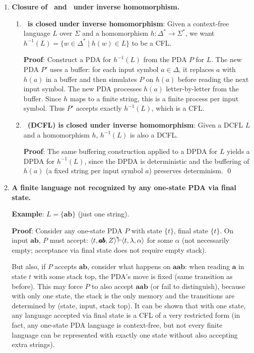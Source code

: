 \begin{enumerate}[{10.}1. ]
\item \textbf{Closure of \PSIG\ and \ASIG\ under inverse homomorphism.}

\begin{enumerate}
\item \textbf{\PSIG\ is closed under inverse homomorphism}: Given a context-free language $L$ over $\Sigma$ and a homomorphism $h: \Delta^* \to \Sigma^*$, we want $h^{-1}(L) = \{w \in \Delta^* \mid h(w) \in L\}$ to be a CFL.

\textbf{Proof}: Construct a PDA for $h^{-1}(L)$ from the PDA $P$ for $L$. The new PDA $P'$ uses a buffer: for each input symbol $a\in\Delta$, it replaces $a$ with $h(a)$ in a buffer and then simulates $P$ on $h(a)$ before reading the next input symbol. The new PDA processes $h(a)$ letter-by-letter from the buffer. Since $h$ maps to a finite string, this is a finite process per input symbol. Thus $P'$ accepts exactly $h^{-1}(L)$, which is a CFL.

\item \textbf{\ASIG\ (DCFL) is closed under inverse homomorphism}: Given a DCFL $L$ and a homomorphism $h$, $h^{-1}(L)$ is also a DCFL.

\textbf{Proof}: The same buffering construction applied to a DPDA for $L$ yields a DPDA for $h^{-1}(L)$, since the DPDA is deterministic and the buffering of $h(a)$ (a fixed string per input symbol $a$) preserves determinism. \qed
\end{enumerate}

\item \textbf{A finite language not recognized by any one-state PDA via final state.}

\textbf{Example}: $L = \{\pmb{ab}\}$ (just one string).

\textbf{Proof}: Consider any one-state PDA $P$ with state $\{t\}$, final state $\{t\}$. On input $\pmb{ab}$, $P$ must accept: $\langle t,\pmb{ab},Z\rangle\Dvdash\langle t,\lambda,\alpha\rangle$ for some $\alpha$ (not necessarily empty; acceptance via final state does not require empty stack).

But also, if $P$ accepts $\pmb{ab}$, consider what happens on $\pmb{aab}$: when reading $\pmb{a}$ in state $t$ with some stack top, the PDA's move is fixed (same transition as before). This may force $P$ to also accept $\pmb{aab}$ (or fail to distinguish), because with only one state, the stack is the only memory and the transitions are determined by (state, input, stack top). It can be shown that with one state, any language accepted via final state is a CFL of a very restricted form (in fact, any one-state PDA language is context-free, but not every finite language can be represented with exactly one state without also accepting extra strings).


\end{enumerate}
